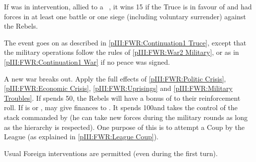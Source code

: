 \phpaix
\aparag If \LIG was in intervention, allied to a \CATHCR\ \FRA, it wins 15 \PV
if the Truce is in favour of \FRA and \LIG had forces in at least one battle
or one siege (including voluntary surrender) against the Rebels.


\phevnt
\aparag The event goes on as described in \ref{pIII:FWR:Continuation1 Truce},
except that the military operations follow the rules of \ref{pIII:FWR:War2
  Military}, or as in \ref{pIII:FWR:Continuation1 War} if no peace was signed.





\phevnt
\aparag A new war breaks out. Apply the full effects of \ref{pIII:FWR:Politic
  Crisis}, \ref{pIII:FWR:Economic Crisis}, \ref{pIII:FWR:Uprisings} and
\ref{pIII:FWR:Military Troubles}.
\aparag If \REB spends 50\ducats, the Rebels will have a bonus of 
to their reinforcement roll.
\aparag If \FRA is \CATHCR or \CATHCO, \LIG may give finances to \lig.  It
spends 100\ducats and takes the control of the stack commanded by
 (he can take new forces during the military rounds as
long as the hierarchy is respected). One purpose of this is to attempt a Coup
by the League (as explained in \ref{pIII:FWR:League Coup}).

\phdipl
\aparag Usual Foreign interventions are permitted (even during the first
turn).


